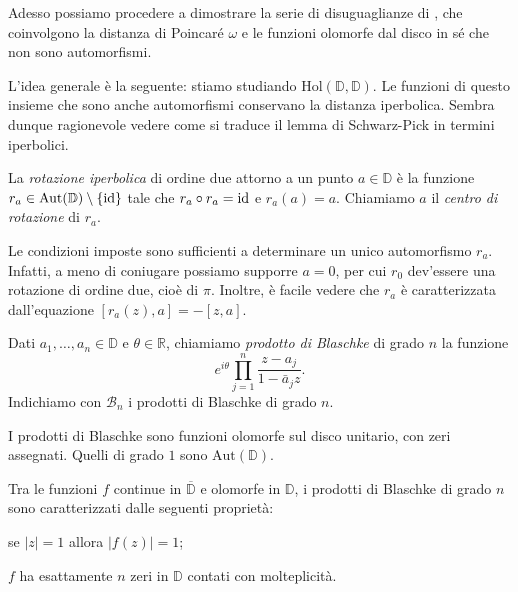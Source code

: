 Adesso possiamo procedere a dimostrare la serie di disuguaglianze di \cite{BM}, che coinvolgono la distanza di Poincaré $\omega$ e le funzioni olomorfe dal disco in sé che non sono automorfismi.

L'idea generale è la seguente: stiamo studiando $\text{Hol}(\mathbb{D},\mathbb{D})$. Le funzioni di questo insieme che sono anche automorfismi conservano la distanza iperbolica. Sembra dunque ragionevole vedere come si traduce il lemma di Schwarz-Pick in termini iperbolici.

\begin{defn}
  La \textit{rotazione iperbolica} di ordine due attorno a un punto $a \in \mathbb{D}$ è la funzione $r_a \in \text{Aut}(\mathbb{D})\setminus\{\operatorname{id}\}$ tale che $r_a \circ r_a=\operatorname{id}$ e $r_a(a)=a$.
  Chiamiamo $a$ il \textit{centro di rotazione} di $r_a$.
\end{defn}

\begin{oss}
  Le condizioni imposte sono sufficienti a determinare un unico automorfismo $r_a$. Infatti, a meno di coniugare possiamo supporre $a=0$, per cui $r_0$ dev'essere una rotazione di ordine due, cioè di $\pi$. Inoltre, è facile vedere che $r_a$ è caratterizzata dall'equazione $[r_a(z),a]=-[z,a]$.
\end{oss}

\begin{defn}
  Dati $a_1,\dots,a_n \in \mathbb{D}$ e $\theta \in \mathbb{R}$, chiamiamo \textit{prodotto di Blaschke} di grado $n$ la funzione
  $$e^{i\theta}\prod_{j=1}^n \frac{z-a_j}{1-\bar{a}_jz}.$$
  Indichiamo con $\mathcal{B}_n$ i prodotti di Blaschke di grado $n$.
\end{defn}

\begin{oss}
  I prodotti di Blaschke sono funzioni olomorfe sul disco unitario, con zeri assegnati. Quelli di grado $1$ sono $\text{Aut}(\mathbb{D})$.
\end{oss}

\begin{lm} \label{Blaschke-car}
  Tra le funzioni $f$ continue in $\overline{\mathbb{D}}$ e olomorfe in $\mathbb{D}$, i prodotti di Blaschke di grado $n$ sono caratterizzati dalle seguenti proprietà:
  \begin{nlist}
    \item se $|z|=1$ allora $|f(z)|=1$;
    \item $f$ ha esattamente $n$ zeri in $\mathbb{D}$ contati con molteplicità.
  \end{nlist}
\end{lm}

